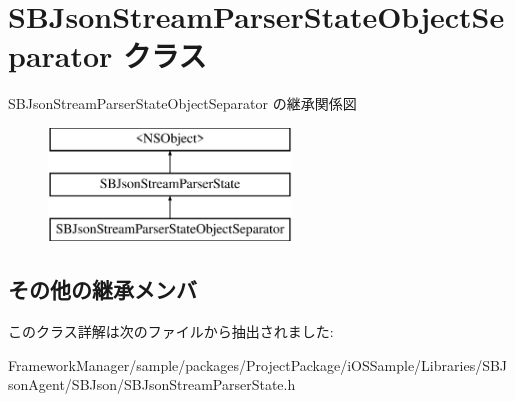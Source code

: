 \hypertarget{interface_s_b_json_stream_parser_state_object_separator}{}\section{S\+B\+Json\+Stream\+Parser\+State\+Object\+Separator クラス}
\label{interface_s_b_json_stream_parser_state_object_separator}
S\+B\+Json\+Stream\+Parser\+State\+Object\+Separator の継承関係図\begin{figure}[H]
\begin{center}
\leavevmode
\includegraphics[height=3.000000cm]{interface_s_b_json_stream_parser_state_object_separator}
\end{center}
\end{figure}
\subsection*{その他の継承メンバ}


このクラス詳解は次のファイルから抽出されました\+:\begin{DoxyCompactItemize}
\item 
Framework\+Manager/sample/packages/\+Project\+Package/i\+O\+S\+Sample/\+Libraries/\+S\+B\+Json\+Agent/\+S\+B\+Json/S\+B\+Json\+Stream\+Parser\+State.\+h\end{DoxyCompactItemize}
